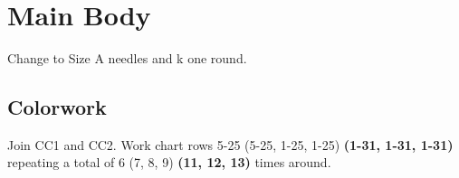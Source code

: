 \documentclass[12pt]{article}
\newcommand{\comment}[1]{} %
\newcommand{\vocab}[1]{\emph{\textbf{#1}}} %
\renewcommand{\repeat}[1]{\textbf{[#1]}} %
\newcommand{\blank}{\underline{\hspace{2em}} } %
\newcommand{\increase}[1]{(\emph{+#1 
	\ifnum#1=1{st}\else{sts}\fi})}
\newenvironment{frnote}
    {%
    	\setlength{\FrameRule}{1.5pt}
    	\def\FrameCommand{\fboxrule=\FrameRule\fboxsep=\FrameSep \fcolorbox{framecolor}{shadecolor}}
    	\MakeFramed {\FrameRestore}}
    {\setlength{\FrameRule}{1pt}
	\endMakeFramed}
\begin{document}
\begin{multicols}{2}
\vfill
~\\
\columnbreak
\section*{Main Body}

Change to Size A needles and k one round. 
\comment{If you are making a beanie, skip the increases and proceed to colorwork.

\subsection*{Increases \emph{(slouchy only)}}

Work Increase Round once, then k one round. Proceed to colorwork.

\begin{frnote}
\vocab{Adult S, M, and L only:} Work Increase Round once more, k one round.
\end{frnote}

\textbf{Increase Round:} \repeat{K \blank, m1} to end of round. \increase{10}

Upon completing the slouchy increases, you should have \blank sts total. Proceed to colorwork.}

\subsection*{Colorwork}

Join CC1 and CC2. Work chart rows 5-25 (5-25, 1-25, 1-25) \textbf{(1-31, 1-31, 1-31)} repeating a total of 6 (7, 8, 9) \textbf{(11, 12, 13)} times around.  


\end{multicols}
\end{document}
